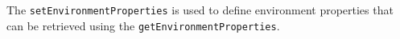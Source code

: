 The \verb+setEnvironmentProperties+ is used to define environment properties that can be retrieved using the
\verb+getEnvironmentProperties+.
